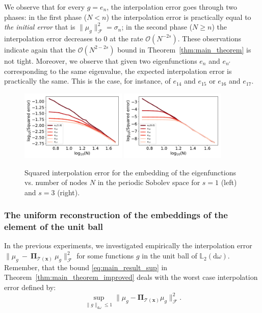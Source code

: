 \documentclass[twoside,11pt]{book}
\numberwithin{theorem}{chapter}
\numberwithin{definition}{chapter}
\numberwithin{proposition}{chapter}
\numberwithin{corollary}{chapter}
\numberwithin{example}{chapter}
\numberwithin{lemma}{chapter}
\begin{document}
 We observe that for every $g = e_{n}$, the interpolation error goes through two phases: in the first phase ($N < n$) the interpolation error is practically equal to \emph{the initial error} that is $\|\mu_{g}\|_{\mathcal{F}}^{2} = \sigma_{n}$; in the second phase ($N \geq n$) the interpolation error decreases to $0$ at the rate $\mathcal{O}(N^{-2s})$. These observations indicate again that the $\mathcal{O}(N^{2-2s})$ bound in Theorem~\ref{thm:main_theorem} is not tight.
 Moreover, we observe that given two eigenfunctions $e_{n}$ and $e_{n'}$ corresponding to the same eigenvalue, the expected interpolation error is practically the same. This is the case, for instance, of $e_{14}$ and $e_{15}$ or $e_{16}$ and $e_{17}$.
\begin{figure}
\centering
\includegraphics[width=0.45\textwidth]{img/neurips/Sobolev/multig_interpolation_pSobolev_s_1_fig_1.pdf}
\includegraphics[width=0.45\textwidth]{img/neurips/Sobolev/multig_interpolation_pSobolev_s_3_fig_1.pdf}\\
\caption{Squared interpolation error for the embedding of the eigenfunctions vs. number of nodes $N$ in the periodic Sobolev space for $s = 1$ (left) and $s=3$ (right).
\label{fig:pDPP_results_pSobolev_exp_2}}
\end{figure}
\subsubsection{The uniform reconstruction of the embeddings of the element of the unit ball}



In the previous experiments, we investigated empirically the interpolation error $\|\mu_{g}~-~\bm{\Pi}_{\mathcal{T}(\bm{x})}~\mu_{g}\|_{\mathcal{F}}^{2}$ for some functions $g$ in the unit ball of $\mathbb{L}_{2}(\mathrm{d}\omega)$. Remember, that the bound \eqref{eq:main_result_sup} in Theorem~\ref{thm:main_theorem_improved} deals with the worst case interpolation error defined by:
\begin{equation}\label{eq:worst_interpolation_error_supunitball}
\sup\limits_{\|g\|_{\mathrm{d}\omega} \leq 1} \|\mu_{g}-\bm{\Pi}_{\mathcal{T}(\bm{x})} \mu_{g}\|_{\mathcal{F}}^{2}.
\end{equation}
\end{document}
